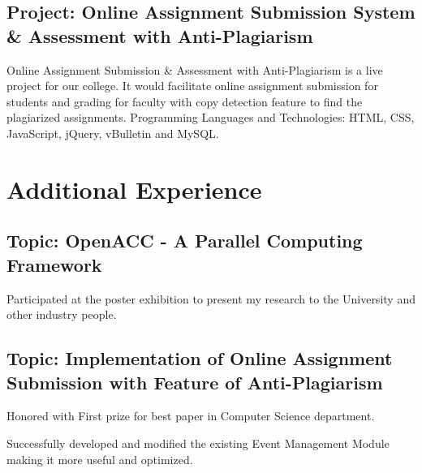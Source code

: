 \documentclass{Mihir_Kavatkar-Resume}
\begin{document}
		\vspace*{-0.5em}
		\subsection{Project: Online Assignment Submission System \& Assessment with Anti-Plagiarism}
		\vspace*{-0.5em}
		\workitems
		{Online Assignment Submission \& Assessment with Anti-Plagiarism is a live project for our college. It would facilitate online assignment submission for students and grading for faculty with copy detection feature to find the plagiarized assignments.}
		{Programming Languages and Technologies: HTML, CSS, JavaScript, jQuery, vBulletin and MySQL.}
		
	\section{Additional Experience}
		\vspace*{-0.5em}
		\vspace*{-0.5em}
		\subsection{Topic: OpenACC - A Parallel Computing Framework}
		\workitemsAdditional
		{Participated at the poster exhibition to present my research to the University and other industry people.}
		
		\iffalse
		\vspace*{-0.5em}
		\vspace*{-0.5em}
		\subsection{Topic: Implementation of Online Assignment Submission with Feature of Anti-Plagiarism}
		\workitemsAdditional
		{Honored with First prize for best paper in Computer Science department.}
		
		\vspace*{-0.5em}
		\workitemsAdditional
		{Successfully  developed  and  modified  the  existing  Event  Management  Module  making  it  more  useful  and optimized.}
		
\end{document}
